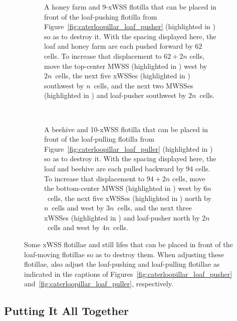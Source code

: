 \begin{figure}[!htb]
	\centering
	\begin{subfigure}[b]{\textwidth}
		\centering
		\caption{A honey farm and 9-xWSS flotilla that can be placed in front of the loaf-pushing flotilla from Figure~\ref{fig:caterloopillar_loaf_pusher} (highlighted in ) so as to destroy it. With the spacing displayed here, the loaf and honey farm are each pushed forward by $62$ cells. To increase that displacement to $62 + 2n$ cells, move the top-center MWSS (highlighted in ) west by $2n$~cells, the next five xWSSes (highlighted in ) southwest by $n$~cells, and the next two MWSSes (highlighted in ) and loaf-pusher southwest by $2n$~cells.}\label{fig:caterloopillar_front_end}
	\end{subfigure}\\[0.3cm]
	\begin{subfigure}[b]{\textwidth}
		\centering
		\caption{A beehive and 10-xWSS flotilla that can be placed in front of the loaf-pulling flotilla from Figure~\ref{fig:caterloopillar_loaf_puller} (highlighted in ) so as to destroy it. With the spacing displayed here, the loaf and beehive are each pulled backward by $94$ cells. To increase that displacement to $94 + 2n$ cells, move the bottom-center MWSS (highlighted in ) west by $6n$~cells, the next five xWSSes (highlighted in ) north by $n$~cells and west by $3n$~cells, and the next three xWSSes (highlighted in ) and loaf-pusher north by $2n$~cells and west by $4n$~cells.}\label{fig:caterloopillar_back_end}
	\end{subfigure}
	\caption{Some xWSS flotillae and still lifes that can be placed in front of the loaf-moving flotillae so as to destroy them. When adjusting these flotillae, also adjust the loaf-pushing and loaf-pulling flotillae as indicated in the captions of Figures~\ref{fig:caterloopillar_loaf_pusher} and~\ref{fig:caterloopillar_loaf_puller}, respectively.}\label{fig:caterloopillar_front_back}
\end{figure}


\subsection{Putting It All Together}\label{sec:caterloopillar_itself}


